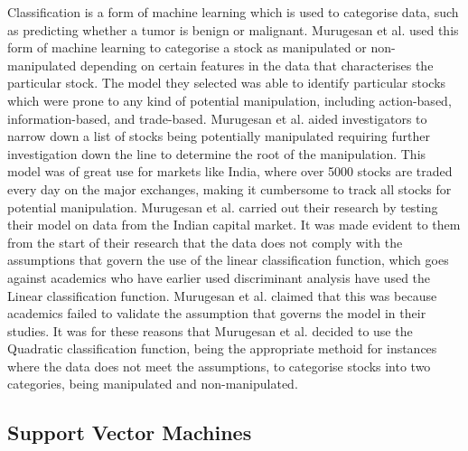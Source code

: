 Classification is a form of machine learning which is used to categorise data, such as predicting whether a tumor is benign or malignant. Murugesan et al. used this form of machine learning to categorise a stock as manipulated or non-manipulated depending on certain features in the data that characterises the particular stock.\cite{Murugesan:2012aa} The model they selected was able to identify particular stocks which were prone to any kind of potential manipulation, including action-based, information-based, and trade-based. Murugesan et al. aided investigators to narrow down a list of stocks being potentially manipulated requiring further investigation down the line to determine the root of the manipulation. This model was of great use for markets like India, where over 5000 stocks are traded every day on the major exchanges, making it cumbersome to track all stocks for potential manipulation. Murugesan et al. carried out their research by testing their model on data from the Indian capital market. It was made evident to them from the start of their research that the data does not comply with the assumptions that govern the use of the linear classification function, which goes against academics who have earlier used discriminant analysis have used the Linear classification function. Murugesan et al. claimed that this was because academics failed to validate the assumption that governs the model in their studies. It was for these reasons that Murugesan et al. decided to use the Quadratic classification function, being the appropriate methoid for instances where the data does not meet the assumptions, to categorise stocks into two categories, being manipulated and non-manipulated.

\subsection{Support Vector Machines}

